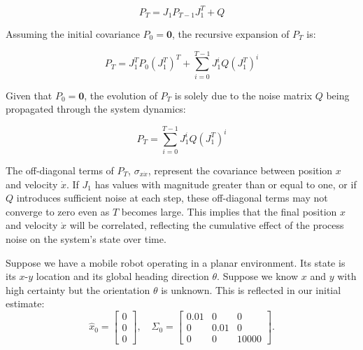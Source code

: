 \documentclass[answers]{exam}
\begin{document}
\begin{questions}
\begin{parts}
\begin{solution}
            \[
                P_T = J_1 P_{T-1} J_1^T + Q
            \]

            Assuming the initial covariance \( P_0 = \mathbf{0} \), the recursive expansion
            of \( P_T \) is:

            \[
                P_T = J_1^T P_0 (J_1^T)^T + \sum_{i=0}^{T-1} J_1^i Q (J_1^T)^i
            \]

            Given that \( P_0 = \mathbf{0} \), the evolution of \( P_T \) is solely due to
            the noise matrix \( Q \) being propagated through the system dynamics:

            \[
                P_T = \sum_{i=0}^{T-1} J_1^i Q (J_1^T)^i
            \]

            The off-diagonal terms of \( P_T \), \( \sigma_{x\dot{x}} \), represent the
            covariance between position \( x \) and velocity \( \dot{x} \). If \( J_1 \)
            has values with magnitude greater than or equal to one, or if \( Q \)
            introduces sufficient noise at each step, these off-diagonal terms may not
            converge to zero even as \( T \) becomes large. This implies that the final
            position \( x \) and velocity \( \dot{x} \) will be correlated, reflecting the
            cumulative effect of the process noise on the system's state over time.
        \end{solution}
    \end{parts}

    \question[20]
    Suppose we have a mobile robot operating in a planar environment. Its state is its \(x\)-\(y\) location and its global heading direction \(\theta\). Suppose we know \(x\) and \(y\) with high certainty but the orientation \(\theta\) is unknown. This is reflected in our initial estimate:
    \[
        \hat{x}_0 = \begin{bmatrix} 0 \\ 0 \\ 0 \end{bmatrix}, \quad
        \Sigma_0 = \begin{bmatrix} 0.01 & 0 & 0 \\ 0 & 0.01 & 0 \\ 0 & 0 & 10000 \end{bmatrix}.
    \]
    \begin{parts}

\end{parts}
\end{questions}
\end{document}
